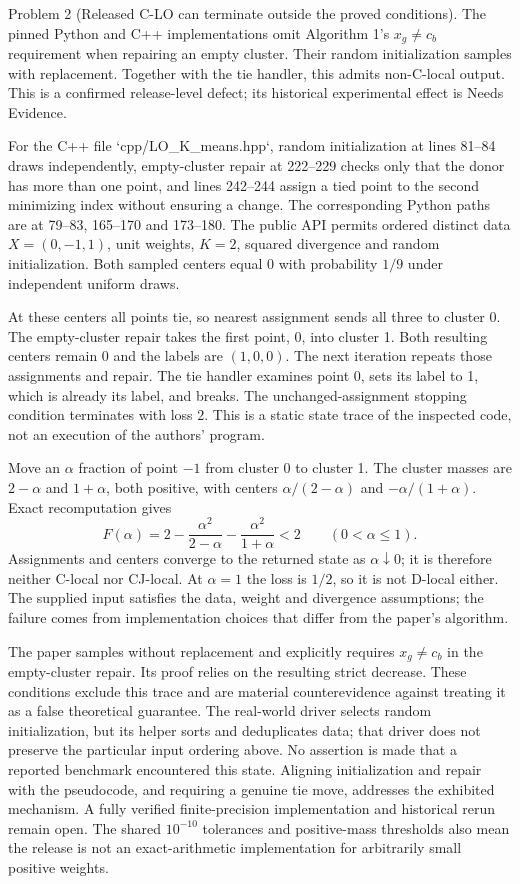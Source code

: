 \documentclass[10pt]{article}
\begin{document}
Problem 2 (Released C-LO can terminate outside the proved conditions).  The pinned Python and C++ implementations omit Algorithm 1’s \(x_g\ne c_b\) requirement when repairing an empty cluster. Their random initialization samples with replacement. Together with the tie handler, this admits non-C-local output. This is a confirmed release-level defect; its historical experimental effect is Needs Evidence.\par
For the C++ file `cpp/LO\_K\_means.hpp`, random initialization at lines 81–84 draws independently, empty-cluster repair at 222–229 checks only that the donor has more than one point, and lines 242–244 assign a tied point to the second minimizing index without ensuring a change. The corresponding Python paths are at 79–83, 165–170 and 173–180. The public API permits ordered distinct data \(X=(0,-1,1)\), unit weights, \(K=2\), squared divergence and random initialization. Both sampled centers equal \(0\) with probability \(1/9\) under independent uniform draws.\par
At these centers all points tie, so nearest assignment sends all three to cluster 0. The empty-cluster repair takes the first point, \(0\), into cluster 1. Both resulting centers remain \(0\) and the labels are \((1,0,0)\). The next iteration repeats those assignments and repair. The tie handler examines point \(0\), sets its label to 1, which is already its label, and breaks. The unchanged-assignment stopping condition terminates with loss \(2\). This is a static state trace of the inspected code, not an execution of the authors’ program.\par
Move an \(\alpha\) fraction of point \(-1\) from cluster 0 to cluster 1. The cluster masses are \(2-\alpha\) and \(1+\alpha\), both positive, with centers \(\alpha/(2-\alpha)\) and \(-\alpha/(1+\alpha)\). Exact recomputation gives \[F(\alpha)=2-\frac{\alpha^2}{2-\alpha}-\frac{\alpha^2}{1+\alpha}<2
 \qquad(0<\alpha\leq1).\] Assignments and centers converge to the returned state as \(\alpha\downarrow0\); it is therefore neither C-local nor CJ-local. At \(\alpha=1\) the loss is \(1/2\), so it is not D-local either. The supplied input satisfies the data, weight and divergence assumptions; the failure comes from implementation choices that differ from the paper’s algorithm.\par
The paper samples without replacement and explicitly requires \(x_g\ne c_b\) in the empty-cluster repair. Its proof relies on the resulting strict decrease. These conditions exclude this trace and are material counterevidence against treating it as a false theoretical guarantee. The real-world driver selects random initialization, but its helper sorts and deduplicates data; that driver does not preserve the particular input ordering above. No assertion is made that a reported benchmark encountered this state. Aligning initialization and repair with the pseudocode, and requiring a genuine tie move, addresses the exhibited mechanism. A fully verified finite-precision implementation and historical rerun remain open. The shared \(10^{-10}\) tolerances and positive-mass thresholds also mean the release is not an exact-arithmetic implementation for arbitrarily small positive weights.\par
\end{document}
